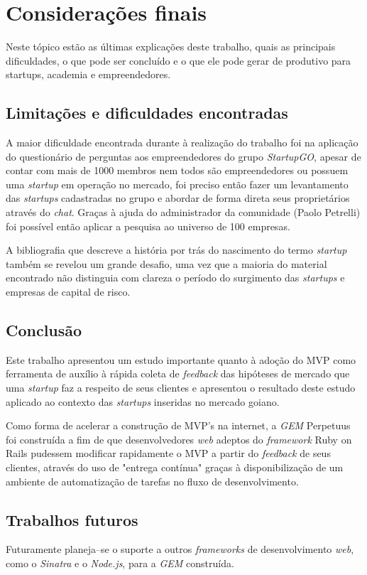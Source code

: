 \chapter{Considera\c{c}\~oes finais}

Neste t\'opico est\~ao as \'ultimas explica\c{c}\~oes deste trabalho, quais as principais dificuldades, o que pode ser conclu\'ido e o que ele pode gerar de produtivo para startups, academia e empreendedores.

\section{Limita\c{c}\~oes e dificuldades encontradas}

A maior dificuldade encontrada durante \`a realiza\c{c}\~ao do trabalho foi na aplica\c{c}\~ao do question\'ario de perguntas aos empreendedores do grupo \emph{StartupGO}, apesar de contar com mais de 1000 membros nem todos s\~ao empreendedores ou possuem uma \emph{startup} em opera\c{c}\~ao no mercado, foi preciso ent\~ao fazer um levantamento das \emph{startups} cadastradas no grupo e abordar de forma direta seus propriet\'arios atrav\'es do \emph{chat}. Gra\c{c}as \`a ajuda do administrador da comunidade (Paolo Petrelli) foi poss\'ivel ent\~ao aplicar a pesquisa ao universo de 100 empresas.

A bibliografia que descreve a hist\'oria por tr\'as do nascimento do termo \emph{startup} tamb\'em se revelou um grande desafio, uma vez que a maioria do material encontrado n\~ao distinguia com clareza o per\'iodo do surgimento das \emph{startups} e empresas de capital de risco.

\section{Conclus\~ao}

Este trabalho apresentou um estudo importante quanto \`a ado\c{c}\~ao do MVP como ferramenta de aux\'ilio \`a r\'apida coleta de \emph{feedback} das hip\'oteses de mercado que uma \emph{startup} faz a respeito de seus clientes e apresentou o resultado deste estudo aplicado ao contexto das \emph{startups} inseridas no mercado goiano.

Como forma de acelerar a constru\c{c}\~ao de MVP's na internet, a \emph{GEM} Perpetuus foi constru\'ida a fim de que desenvolvedores \emph{web} adeptos do \emph{framework} Ruby on Rails pudessem modificar rapidamente o MVP a partir do \emph{feedback} de seus clientes, atrav\'es do uso de "entrega cont\'inua" gra\c{c}as \`a disponibiliza\c{c}\~ao de um ambiente de automatiza\c{c}\~ao de tarefas no fluxo de desenvolvimento.

\section{Trabalhos futuros}

Futuramente planeja--se o suporte a outros \emph{frameworks} de desenvolvimento \emph{web}, como o \emph{Sinatra} e o \emph{Node.js}, para a \emph{GEM} constru\'ida.